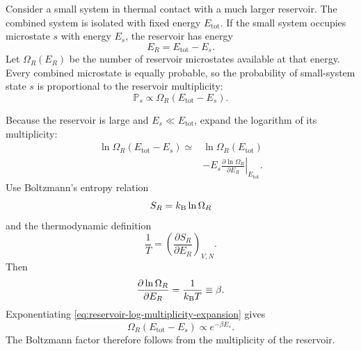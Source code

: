 Consider a small system in thermal contact with a much larger reservoir.  The
combined system is isolated with fixed energy $E_{\mathrm{tot}}$.  If the small
system occupies microstate $s$ with energy $E_s$, the reservoir has energy
\begin{equation}
  E_R=E_{\mathrm{tot}}-E_s.
  \label{eq:reservoir-energy-after-system-state}
\end{equation}
Let $\Omega_R(E_R)$ be the number of reservoir microstates available at that
energy.  Every combined microstate is equally probable, so the probability of
small-system state $s$ is proportional to the reservoir multiplicity:
\begin{equation}
  \mathbb P_s\propto
  \Omega_R(E_{\mathrm{tot}}-E_s).
  \label{eq:system-probability-from-reservoir-multiplicity}
\end{equation}

Because the reservoir is large and $E_s\ll E_{\mathrm{tot}}$, expand the
logarithm of its multiplicity:
\begin{equation}
\begin{aligned}
  \ln\Omega_R(E_{\mathrm{tot}}-E_s)
  \simeq{}&\ln\Omega_R(E_{\mathrm{tot}})\\
  &-E_s
  \left.
  \frac{\partial\ln\Omega_R}{\partial E_R}
  \right|_{E_{\mathrm{tot}}}.
\end{aligned}
  \label{eq:reservoir-log-multiplicity-expansion}
\end{equation}
Use Boltzmann's entropy relation
\begin{equation}
  S_R=k_{\mathrm B}\ln\Omega_R
  \label{eq:boltzmann-entropy-multiplicity}
\end{equation}
and the thermodynamic definition
\begin{equation}
  \frac{1}{T}
  =\left(\frac{\partial S_R}{\partial E_R}\right)_{V,N}.
  \label{eq:temperature-entropy-derivative}
\end{equation}
Then
\begin{equation}
  \frac{\partial\ln\Omega_R}{\partial E_R}
  =\frac{1}{k_{\mathrm B} T}
  \equiv\beta.
  \label{eq:beta-from-reservoir-multiplicity}
\end{equation}
Exponentiating \cref{eq:reservoir-log-multiplicity-expansion} gives
\begin{equation}
  \Omega_R(E_{\mathrm{tot}}-E_s)
  \propto e^{-\beta E_s}.
  \label{eq:boltzmann-weight-from-reservoir}
\end{equation}
The Boltzmann factor therefore follows from the multiplicity of the reservoir.


